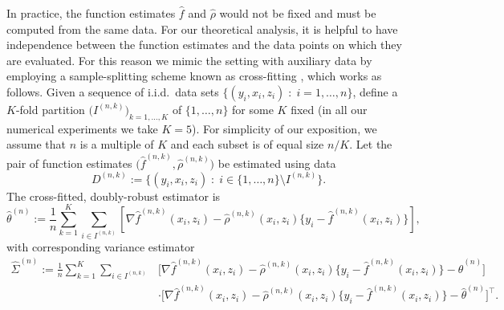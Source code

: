 \documentclass[aos]{imsart}
\begin{document}
	In practice, the function estimates $\hat f$ and $\hat \rho$ would not be fixed and must be computed from the same data. For our theoretical analysis, it is helpful to have independence between the function estimates and the data points on which they are evaluated. For this reason we mimic the setting with auxiliary data by employing a
	sample-splitting scheme known as cross-fitting \citep{schick1986asymptotically,ChernozhukovTreatment}, which works as follows.
%	
%	
%	
	Given a sequence of i.i.d.\ data sets $\{(y_i,x_i,z_i)\;:\; i=1,\ldots,n\}$, define a $K$-fold partition $\big(I^{(n,k)}\big)_{k=1,\ldots,K}$ of $\{1,\ldots,n\}$ for some $K$ fixed (in all our numerical experiments we take $K=5$). For simplicity of our exposition, we assume that $n$ is a multiple of $K$ and each subset is of equal size $n/K$. Let the pair of function estimates $\big(\hat f^{(n,k)},\hat\rho^{(n,k)}\big)$ be estimated using data
	\begin{equation*}
		D^{(n,k)} := \big\{(y_i,x_i,z_i)\;:\; i\in \{1,\ldots,n\}\setminus I^{(n,k)}\big\}.
	\end{equation*} The cross-fitted, doubly-robust estimator is
\begin{equation} \label{eqn:est}
		\hat\theta^{(n)} := \frac1n \sum_{k=1}^K  \sum_{i\in I^{(n,k)}} \left[ \nabla \hat f^{(n,k)}(x_i,z_i) - \hat\rho^{(n,k)}(x_i,z_i)\big\{y_i-\hat f^{(n,k)}(x_i,z_i)\big\} \right], 
	\end{equation}
	with corresponding variance estimator
	\begin{equation} \label{eq:Sigma_est}
		\begin{split}
					\hat \Sigma^{(n)} := \frac1n \sum_{k=1}^K \sum_{i\in I^{(n,k)}} &\Big[\nabla \hat f^{(n,k)}(x_i,z_i) - \hat\rho^{(n,k)}(x_i,z_i)\big\{y_i-\hat f^{(n,k)}(x_i,z_i)\big\} -\hat\theta^{(n)}\Big]\\
			&\cdot \Big[\nabla \hat f^{(n,k)}(x_i,z_i) - \hat\rho^{(n,k)}(x_i,z_i)\big\{y_i-\hat f^{(n,k)}(x_i,z_i)\big\} -\hat\theta^{(n)}\Big]^{\top}.
		\end{split}
	\end{equation}
\end{document}
